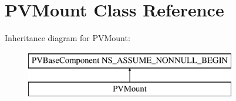 \hypertarget{interface_p_v_mount}{}\section{P\+V\+Mount Class Reference}
\label{interface_p_v_mount}
Inheritance diagram for P\+V\+Mount\+:\begin{figure}[H]
\begin{center}
\leavevmode
\includegraphics[height=2.000000cm]{interface_p_v_mount}
\end{center}
\end{figure}
